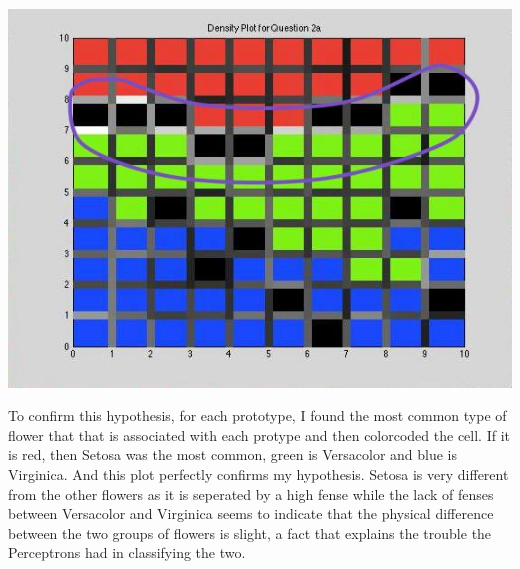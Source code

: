 \documentclass[epsfig]{article}
\begin{document}
\begin{center}
\includegraphics[scale=0.5]{pic8}
\end{center}
To confirm this hypothesis, for each prototype, I found the most common type of flower that that is associated with each protype and then colorcoded the cell. If it is red, then Setosa was the most common, green is Versacolor and blue is Virginica. And this plot perfectly confirms my hypothesis. Setosa is very different from the other flowers as it is seperated by a high fense while the lack of fenses between Versacolor and Virginica seems to indicate that the physical difference between the two groups of flowers is slight, a fact that explains the trouble the Perceptrons had in classifying the two.
\end{document}
